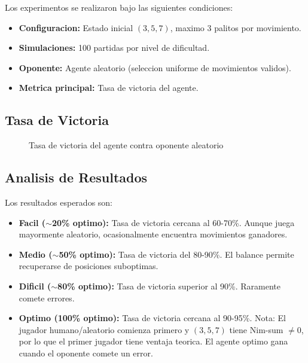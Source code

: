 \documentclass[12pt,a4paper]{article}
\theoremstyle{definition}
\begin{document}
Los experimentos se realizaron bajo las siguientes condiciones:

\begin{itemize}
    \item \textbf{Configuracion:} Estado inicial $(3, 5, 7)$, maximo 3 palitos por movimiento.
    \item \textbf{Simulaciones:} 100 partidas por nivel de dificultad.
    \item \textbf{Oponente:} Agente aleatorio (seleccion uniforme de movimientos validos).
    \item \textbf{Metrica principal:} Tasa de victoria del agente.
\end{itemize}

\subsection{Tasa de Victoria}

\begin{figure}[H]
\centering
{}
\caption{Tasa de victoria del agente contra oponente aleatorio}
\label{fig:winrate}
\end{figure}

\subsection{Analisis de Resultados}

Los resultados esperados son:

\begin{itemize}
    \item \textbf{Facil ($\sim$20\% optimo):} Tasa de victoria cercana al 60-70\%. Aunque juega mayormente aleatorio, ocasionalmente encuentra movimientos ganadores.
    
    \item \textbf{Medio ($\sim$50\% optimo):} Tasa de victoria del 80-90\%. El balance permite recuperarse de posiciones suboptimas.
    
    \item \textbf{Dificil ($\sim$80\% optimo):} Tasa de victoria superior al 90\%. Raramente comete errores.
    
    \item \textbf{Optimo (100\% optimo):} Tasa de victoria cercana al 90-95\%. Nota: El jugador humano/aleatorio comienza primero y $(3,5,7)$ tiene Nim-sum $\neq 0$, por lo que el primer jugador tiene ventaja teorica. El agente optimo gana cuando el oponente comete un error.
\end{itemize}
\end{document}
